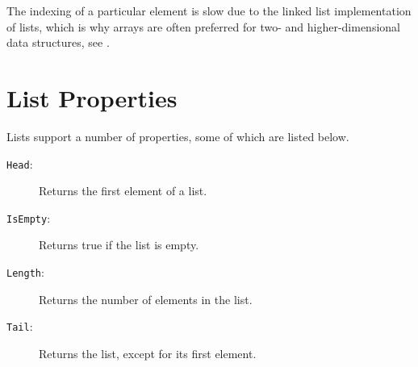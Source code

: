 \documentclass[springer.tex]{subfiles}
\begin{document}
 The indexing of a particular element is slow due to the linked list implementation of lists, which is why arrays are often preferred for two- and higher-dimensional data structures, see .
 \clearpage
 
\section{List Properties}
Lists support a number of properties, some of which are listed below.
\begin{description}
\item[\texttt{Head}:] Returns the first element of a list.
  ~\\
\item[\texttt{IsEmpty}:] Returns true if the list is empty.
  ~\\
\item[\texttt{Length}:] Returns the number of elements in the list.
  ~\\
\item[\texttt{Tail}:] Returns the list, except for its first element.
  ~\\
\end{description}
\end{document}
